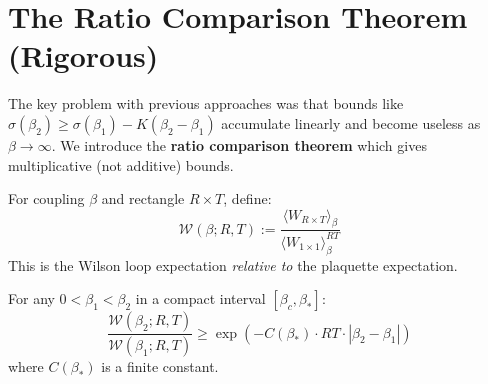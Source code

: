 \section{The Ratio Comparison Theorem (Rigorous)}
\label{sec:ratio-comparison}

The key problem with previous approaches was that bounds like 
$\sigma(\beta_2) \geq \sigma(\beta_1) - K(\beta_2 - \beta_1)$ accumulate 
linearly and become useless as $\beta \to \infty$. We introduce the 
\textbf{ratio comparison theorem} which gives multiplicative (not additive) bounds.

\begin{definition}
\label{def:scaled-wilson}
For coupling $\beta$ and rectangle $R \times T$, define:
\begin{equation}
\mathcal{W}(\beta; R, T) := \frac{\langle W_{R \times T} \rangle_\beta}
{\langle W_{1 \times 1} \rangle_\beta^{RT}}
\end{equation}
This is the Wilson loop expectation \emph{relative to} the plaquette expectation.
\end{definition}

\begin{theorem}
\label{thm:ratio-comparison}
For any $0 < \beta_1 < \beta_2$ in a compact interval $[\beta_c, \beta_*]$:
\begin{equation}
\frac{\mathcal{W}(\beta_2; R, T)}{\mathcal{W}(\beta_1; R, T)} 
\geq \exp\left(-C(\beta_*) \cdot RT \cdot |\beta_2 - \beta_1|\right)
\end{equation}
where $C(\beta_*)$ is a finite constant.
\end{theorem}

